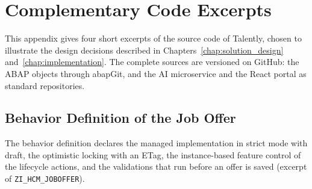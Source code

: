 \chapter{Complementary Code Excerpts}
\label{chap:code_excerpts}

This appendix gives four short excerpts of the source code of Talently, chosen to illustrate the design decisions described in Chapters~\ref{chap:solution_design} and~\ref{chap:implementation}. The complete sources are versioned on GitHub: the ABAP objects through abapGit, and the AI microservice and the React portal as standard repositories.

\lstset{style=mystyle, columns=fullflexible}

\section{Behavior Definition of the Job Offer}

The behavior definition declares the managed implementation in strict mode with draft, the optimistic locking with an ETag, the instance-based feature control of the lifecycle actions, and the validations that run before an offer is saved (excerpt of \texttt{ZI\_HCM\_JOBOFFER}).

